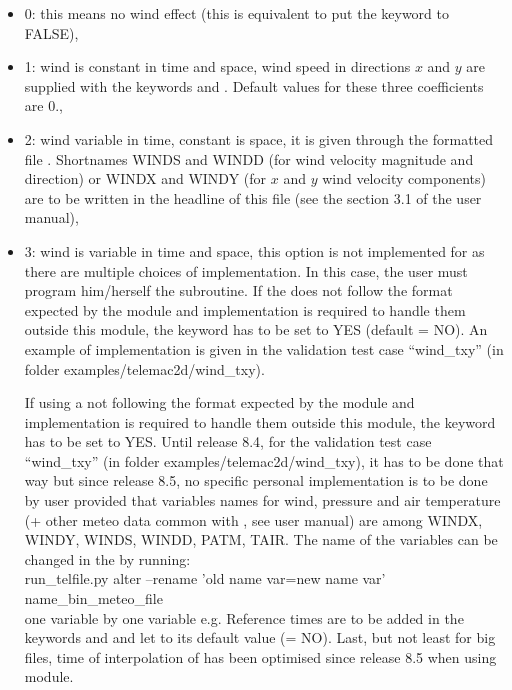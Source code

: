 \begin{itemize}
\item 0: this means no wind effect (this is equivalent to put the keyword
 to FALSE),

\item 1: wind is constant in time and space, wind speed in directions $x$ and $y$
are supplied with the keywords  and
.
Default values for these three coefficients are 0.,

\item 2: wind variable in time, constant is space, it is given through
the formatted file .
Shortnames WINDS and WINDD (for wind velocity magnitude and direction) or
WINDX and WINDY (for $x$ and $y$ wind velocity components) are to be written
in the headline of this file (see the section 3.1 of the \waqtel user manual),

\item 3: wind is variable in time and space, this option is not
implemented for 
as there are multiple choices of implementation.
In this case, the user must program him/herself the  subroutine.
If the 
does not follow the format expected by the
 module and implementation is required to handle them
outside this module, the keyword 
has to be set to YES (default = NO).
An example of implementation is given in the  validation test case
``wind\_txy'' (in folder examples/telemac2d/wind\_txy).

If using a  not following the format
expected by the  module and implementation is
required to handle them outside this module, the keyword
 has to be set to YES.
Until release 8.4, for the validation test case ``wind\_txy'' (in folder
examples/telemac2d/wind\_txy), it has to be done that way but since release
8.5, no specific personal implementation is to be done by user provided that
variables names for wind, pressure and air temperature (+ other meteo data
common with \waqtel, see \waqtel user manual) are among WINDX, WINDY, WINDS,
WINDD, PATM, TAIR.
The name of the variables can be changed in the
 by running:\\
run\_telfile.py alter --rename 'old name var=new name var' name\_bin\_meteo\_file \\
one variable by one variable e.g.
Reference times are to be added in the keywords
 and 
and  let to its default value
(= NO).
Last, but not least for big files, time of interpolation of
 has been optimised since release 8.5
when using  module.


\end{itemize}
